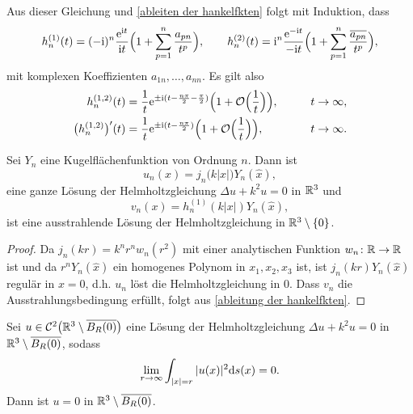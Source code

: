 Aus dieser Gleichung und \eqref{ableiten der hankelfkten} folgt mit Induktion, dass
\begin{equation*}
	h_n^{(1)}(t)=(-\mathrm{i})^n\frac{\mathrm{e}^{\mathrm{i} t}}{\mathrm{i} t}\Big(1+\sum_{p=1}^n\frac{a_{pn}}{t^p}\Big),\qquad h_n^{(2)}(t)=\mathrm{i}^n\frac{\mathrm{e}^{-\mathrm{i} t}}{-\mathrm{i} t}\Big(1+\sum_{p=1}^n\frac{\overline{a_{pn}}}{t^p}\Big),
\end{equation*}
mit komplexen Koeffizienten \(a_{1n},\ldots,a_{nn}\). Es gilt also
\begin{equation}
	\label{ableitung der hankelfkten}
	\begin{aligned}
		h_n^{(1,2)}(t)&=\frac{1}{t}\mathrm{e}^{\pm\mathrm{i}(t-\frac{n\pi}{2}-\frac{\pi}{2})}\Big(1+\mathcal{O}\Big(\frac{1}{t}\Big)\Big),\qquad&t\rightarrow\infty,\\
		\big(h_n^{(1,2)}\big)'(t)&=\frac{1}{t}\mathrm{e}^{\pm\mathrm{i}(t-\frac{n\pi}{2})}\Big(1+\mathcal{O}\Big(\frac{1}{t}\Big)\Big),&t\rightarrow\infty.
	\end{aligned}
\end{equation}
\begin{satz}
	Sei \(Y_n\) eine Kugelflächenfunktion von Ordnung \(n\). Dann ist
	\begin{equation*}
		u_n(x)=j_n\big(k|x|\big)Y_n(\widehat{x}),
	\end{equation*}
	eine ganze Lösung der Helmholtzgleichung \(\Delta u+k^2u=0\) in \(\mathbb{R}^3\) und
	\begin{equation*}
		v_n(x)=h_n^{(1)}(k|x|)Y_n(\widehat{x}),
	\end{equation*}
	ist eine ausstrahlende Lösung der Helmholtzgleichung in \(\mathbb{R}^3\setminus\{0\}\).
\end{satz}
\begin{proof}
	Da \(j_n(kr)=k^nr^nw_n(r^2)\) mit einer analytischen Funktion \(w_n\colon\mathbb{R} \to \mathbb{R}\) ist und da \(r^nY_n(\widehat{x})\) ein homogenes Polynom in \(x_1,x_2,x_3\) ist, ist \(j_n(kr)Y_n(\widehat{x})\) regulär in \(x=0\), d.h. \(u_n\) löst die Helmholtzgleichung in \(0\). Dass \(v_n\) die Ausstrahlungsbedingung erfüllt, folgt aus \eqref{ableitung der hankelfkten}.
\end{proof}
\begin{satz}\label{satz: rellichs lemma}
	Sei \(u\in\mathcal{C}^2\big(\mathbb{R}^3\setminus \overline{B_R(0)}\big)\) eine Lösung der Helmholtzgleichung \(\Delta u+k^2u=0\) in \(\mathbb{R}^3\setminus \overline{B_R(0)}\), sodass
	\begin{equation}
		\label{rellichs lemma gleichung}
		\lim_{r\to\infty}\int_{|x|=r}|u(x)|^2\mathrm{d}s(x)=0.
	\end{equation}
	Dann ist \(u=0\) in \(\mathbb{R}^3\setminus \overline{B_R(0)}\).
\end{satz}
